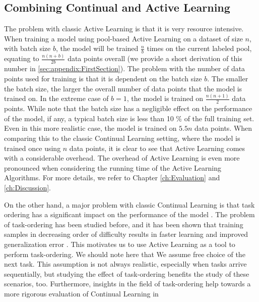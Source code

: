 \subsection{Combining Continual and Active Learning}
\label{sec:Methodology:CombiningCLandAL}
The problem with classic Active Learning is that it is very resource intensive. When training a model using pool-based Active Learning on a dataset of size $n$,
with batch size $b$, the model will be trained $\frac{n}{b}$ times on the current labeled pool, equating to $\frac{n(n+b)}{2b}$ data points overall (we provide a
short derivation of this number in \ref{sec:appendix:FirstSection}). The problem with the number of data points used for training is that it is dependent on the
batch size $b$. The smaller the batch size, the larger the overall number of data points that the model is trained on. In the extreme case of $b=1$, the model
is trained on $\frac{n(n+1)}{2}$ data points. While \cite{beck2021effective} note that the batch size has a negligible effect on the performance of the model,
if any, a typical batch size is less than 10 \% of the full training set. Even in this more realistic case, the model is trained on $5.5n$ data points. When
comparing this to the classic Continual Learning setting, where the model is trained once using $n$ data points, it is clear to see that Active Learning comes
with a considerable overhead. The overhead of Active Learning is even more pronounced when considering the running time of the Active Learning Algorithms.
For more details, we refer to Chapter \ref{ch:Evaluation} and \ref{ch:Discussion}. \par
On the other hand, a major problem with classic Continual Learning is that task ordering has a significant impact on the performance of the model \cite{bell2022effect}.
The problem of task-ordering has been studied before, and it has been shown that training samples in decreasing order of difficulty results in faster learning and 
improved generalization error \cite{hacohen2019power}. This motivates us to use Active Learning as a tool to perform task-ordering. We should note here that We
assume free choice of the next task. This assumption is not always realistic, especially when tasks arrive sequentially, but studying the effect of task-ordering
benefits the study of these scenarios, too. Furthermore, insights in the field of task-ordering help towards a more rigorous evaluation of Continual Learning in 
